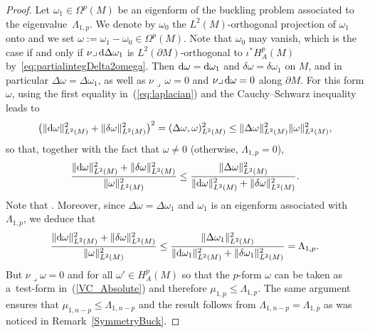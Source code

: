 \documentclass[10pt,a4paper]{amsart}
\numberwithin{equation}{section}
\theoremstyle{definition}
\begin{document}
\begin{proof} Let $\omega_1\in\Omega^p(M)$ be an eigenform of the buckling problem associated to the eigenvalue~$\Lambda_{1,p}$.
We denote by $\omega_0$ the $L^2(M)$-orthogonal projection of $\omega_1$ onto  and we set $\omega:=\omega_1-\omega_0\in \Omega^p(M)$.
Note that $\omega_0$ may vanish, which is the case if and only if $\nu\lrcorner\,{\rm d}\Delta\omega_1$ is $L^2(\partial M)$-orthogonal to $\iota^*H_A^p(M)$ by~\eqref{eq:partialintegDelta2omega}.
Then ${\rm d}\omega={\rm d}\omega_1$ and $\delta\omega=\delta\omega_1$ on $M$, and in particular $\Delta\omega=\Delta\omega_1$, as well as $\nu\lrcorner\,\omega=0$ and $\nu\lrcorner\,{\rm d}\omega=0$ along $\partial M$.
For this form $\omega$, using the first equality in~(\ref{eq:laplacian}) and the Cauchy--Schwarz inequality leads to
\begin{gather*}
\bigl(\|{\rm d}\omega\|_{L^2(M)}^2+\|\delta\omega\|_{L^2(M)}^2\bigr)^2 = (\Delta\omega,\omega )_{L^2(M)}^2 \leq \|\Delta\omega\|_{L^2(M)}^2 \|\omega\|_{L^2(M)}^2,
\end{gather*}
so that, together with the fact that $\omega\neq0$ (otherwise, $\Lambda_{1,p}=0$),
\[
\frac{\|{\rm d}\omega\|_{L^2(M)}^2+\|\delta\omega\|_{L^2(M)}^2}{\|\omega\|_{L^2(M)}^2}\leq\frac{\|\Delta\omega\|_{L^2(M)}^2}{\|{\rm d}\omega\|_{L^2(M)}^2+\|\delta\omega\|_{L^2(M)}^2}.
\]
Note that .
Moreover, since $\Delta\omega=\Delta\omega_1$ and $\omega_1$ is an eigenform associated with $\Lambda_{1,p}$, we deduce that
\[
\frac{\|{\rm d}\omega\|_{L^2(M)}^2+\|\delta\omega\|_{L^2(M)}^2}{\|\omega\|_{L^2(M)}^2}\leq\frac{\|\Delta\omega_1\|_{L^2(M)}^2}{\|{\rm d}\omega_1\|_{L^2(M)}^2+\|\delta\omega_1\|_{L^2(M)}^2}=\Lambda_{1,p}.
\]
But $\nu\lrcorner\omega=0$ and  for all $\omega'\in H_A^p(M)$ so that the $p$-form $\omega$ can be taken as a~test-form in~(\ref{VC_Absolute}) and therefore $\displaystyle\mu_{1,p}\leq \Lambda_{1,p}$.
The same argument ensures that $\mu_{1,n-p}\leq\Lambda_{1,n-p}$ and the result follows from $\Lambda_{1,n-p}=\Lambda_{1,p}$ as was noticed in Remark~\ref{SymmetryBuck}.


\end{proof}
\end{document}
